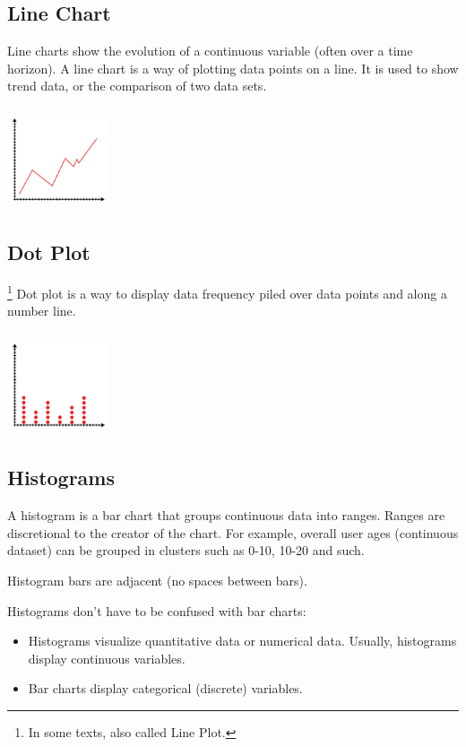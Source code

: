 \documentclass{article}
\begin{document}
\subsection{Line Chart}
Line charts show the evolution of a continuous variable (often over a time horizon).
A line chart is a way of plotting data points on a line. 
It is used to show trend data, or the comparison of two data sets.

\includegraphics[width=3cm, height=3cm]{line_chart}

\subsection{Dot Plot}\footnote{In some texts, also called Line Plot.}
Dot plot is a way to display data frequency piled over data points and along a number line. 

\includegraphics[width=3cm, height=3cm]{dot_plot}

\subsection{Histograms}
A histogram is a bar chart that groups continuous data into ranges. Ranges are discretional to the creator of the chart. For example, overall user ages (continuous dataset) can be grouped in clusters such as 0-10, 10-20 and such.

Histogram bars are adjacent (no spaces between bars).

Histograms don’t have to be confused with bar charts:
\begin{itemize}
    \item Histograms visualize quantitative data or numerical data. Usually, histograms display continuous variables. 
    \item Bar charts display categorical (discrete) variables. 
\end{itemize}
\end{document}

